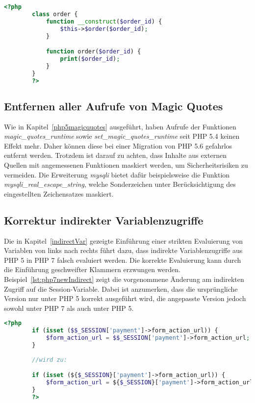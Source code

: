     \begin{lstlisting}[language=php, caption={Beispiel der Ersetzung impliziter Konstruktoren}, label={lst:php7implicit}]
        <?php
        class order {
            function __construct($order_id) {
                $this->$order($order_id);
            }

            function order($order_id) {
                print($order_id);
            }
        }
        ?>
    \end{lstlisting}

    
    \subsection{Entfernen aller Aufrufe von Magic Quotes}
    Wie in Kapitel~\ref{php5magicquotes} ausgeführt, haben Aufrufe der Funktionen \textit{magic\_quotes\_runtime} sowie \textit{set\_magic\_quotes\_runtime} seit \ac{PHP} 5.4 
    keinen Effekt mehr. Daher können diese bei einer Migration von \ac{PHP} 5.6 gefahrlos entfernt werden. Trotzdem ist darauf zu achten, dass Inhalte aus 
    externen Quellen mit angemessenen Funktionen maskiert werden, um Sicherheitsrisiken zu vermeiden. Die Erweiterung \textit{mysqli} bietet dafür beispielsweise 
    die Funktion \textit{mysqli\_real\_escape\_string}, welche Sonderzeichen unter Berücksichtigung des eingestellten Zeichensatzes maskiert.
    
    \subsection{Korrektur indirekter Variablenzugriffe}\label{indirect}
    Die in Kapitel~\ref{indirectVar} gezeigte Einführung einer strikten Evaluierung von Variablen von links nach rechts führt dazu, 
    dass indirekte Variablenzugriffe aus \acs{PHP} 5 in \acs{PHP} 7 falsch evaluiert werden. Die korrekte Evaluierung kann durch 
    die Einführung geschweifter Klammern erzwungen werden. Beispiel~\ref{lst:php7newIndirect} zeigt die vorgenommene Änderung am 
    indirekten Zugriff auf die Session-Variable. Dabei ist anzumerken, dass die ursprüngliche Version nur unter \acs{PHP} 5 
    korrekt ausgeführt wird, die angepasste Version jedoch sowohl unter \acs{PHP} 7 als auch unter \acs{PHP} 5. 
    \begin{lstlisting}[language=php, caption={Anpassung indirekter Variablenzugriffe}, label={lst:php7newIndirect}]
        <?php
        if (isset ($$_SESSION['payment']->form_action_url)) {
            $form_action_url = $$_SESSION['payment']->form_action_url;
        }
        
        //wird zu:

        if (isset (${$_SESSION}['payment']->form_action_url)) {
            $form_action_url = ${$_SESSION}['payment']->form_action_url;
        }       
        ?>
    \end{lstlisting}
    

